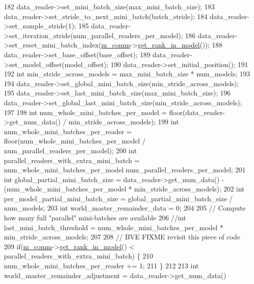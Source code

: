 \begin{DoxyCode}
182   data\_reader->set\_mini\_batch\_size(max\_mini\_batch\_size);
183   data\_reader->set\_stride\_to\_next\_mini\_batch(batch\_stride);
184   data\_reader->set\_sample\_stride(1);
185   data\_reader->set\_iteration\_stride(num\_parallel\_readers\_per\_model);
186   data\_reader->set\_reset\_mini\_batch\_index(\hyperlink{classlbann_1_1generic__io__buffer_a2e4a46c85c8b30e10b1cc5acaa2c4cca}{m\_comm}->\hyperlink{classlbann_1_1lbann__comm_a789453454468a3b70de768537c50ca52}{get\_rank\_in\_model}());
188   data\_reader->set\_base\_offset(base\_offset);
189   data\_reader->set\_model\_offset(model\_offset);
190   data\_reader->set\_initial\_position();
191 
192   \textcolor{keywordtype}{int} min\_stride\_across\_models = max\_mini\_batch\_size * num\_models;  
193 
194   data\_reader->set\_global\_mini\_batch\_size(min\_stride\_across\_models); 
195   data\_reader->set\_last\_mini\_batch\_size(max\_mini\_batch\_size); 
196   data\_reader->set\_global\_last\_mini\_batch\_size(min\_stride\_across\_models); 
197 
198   \textcolor{keywordtype}{int} num\_whole\_mini\_batches\_per\_model = floor(data\_reader->get\_num\_data() / min\_stride\_across\_models);
199   \textcolor{keywordtype}{int} num\_whole\_mini\_batches\_per\_reader = floor(num\_whole\_mini\_batches\_per\_model / 
      num\_parallel\_readers\_per\_model);
200   \textcolor{keywordtype}{int} parallel\_readers\_with\_extra\_mini\_batch = num\_whole\_mini\_batches\_per\_model %
      num\_parallel\_readers\_per\_model;
201   \textcolor{keywordtype}{int} global\_partial\_mini\_batch\_size = data\_reader->get\_num\_data() - (num\_whole\_mini\_batches\_per\_model * 
      min\_stride\_across\_models);
202   \textcolor{keywordtype}{int} per\_model\_partial\_mini\_batch\_size = global\_partial\_mini\_batch\_size / num\_models;
203   \textcolor{keywordtype}{int} world\_master\_remainder\_data = 0;
204 
205   \textcolor{comment}{// Compute how many full "parallel" mini-batches are available}
206   \textcolor{comment}{//int last\_mini\_batch\_threshold = num\_whole\_mini\_batches\_per\_model * min\_stride\_across\_models;}
207 
208   \textcolor{comment}{// BVE FIXME revisit this piece of code}
209   \textcolor{keywordflow}{if}(\hyperlink{classlbann_1_1generic__io__buffer_a2e4a46c85c8b30e10b1cc5acaa2c4cca}{m\_comm}->\hyperlink{classlbann_1_1lbann__comm_a789453454468a3b70de768537c50ca52}{get\_rank\_in\_model}() < parallel\_readers\_with\_extra\_mini\_batch) \{
210     num\_whole\_mini\_batches\_per\_reader += 1;
211   \}
212 
213   \textcolor{keywordtype}{int} world\_master\_remainder\_adjustment = data\_reader->get\_num\_data()

\end{DoxyCode}
